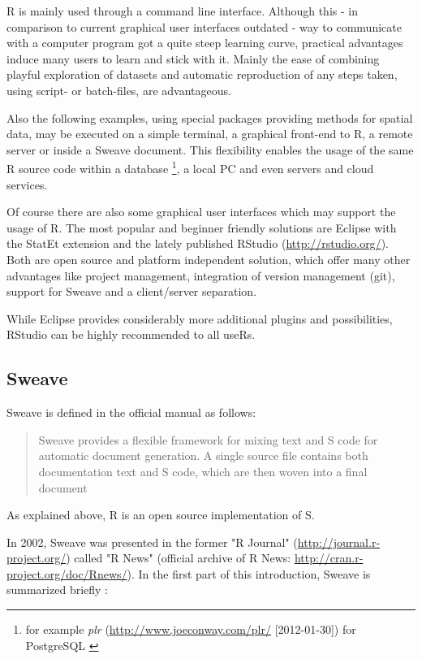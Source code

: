 \documentclass{ifacconf}
\begin{document}
R is mainly used through a command line interface. Although this - in comparison
to current graphical user interfaces outdated - way to communicate 
with a computer program got a quite steep learning curve, practical 
advantages induce many users to learn and stick with it. Mainly the
ease of combining playful exploration of datasets and automatic
reproduction of any steps taken, using script- or batch-files, are advantageous.

Also the following examples, using special packages providing methods 
for spatial data, may be executed on a simple terminal, a graphical front-end to R,
a remote server or inside a Sweave document. This flexibility enables 
the usage of the same R source code within a database
\footnote{for example \textit{plr} (\url{http://www.joeconway.com/plr/} [2012-01-30]) for PostgreSQL 
\citep{group2011postgresql}}, a local PC and even servers and cloud services.

Of course there are also some graphical user interfaces which may support
the usage of R. The most popular and beginner friendly solutions are
Eclipse with the StatEt extension and the lately published RStudio
(\url{http://rstudio.org/}). Both are open source and platform independent solution,
which offer many other advantages like project management, integration of version 
management (git), support for Sweave and a client/server separation.

While Eclipse provides considerably more additional plugins and possibilities,
RStudio can be highly recommended to all useRs.

\subsection{Sweave}
Sweave is defined in the official manual \citep{Sweave:Leisch:2002} as follows:
\begin{quotation}
Sweave provides a flexible 
framework for mixing text 
and S code for automatic document generation. 
A single source file contains both documentation text and S code, which are then woven
into a final document
\end{quotation} 

As explained above, R is an open source implementation of S.

In 2002, Sweave was presented in the former "R Journal"
(\url{http://journal.r-project.org/}) called "R News" (official archive of R News: \url{http://cran.r-project.org/doc/Rnews/}). In the first part of this 
introduction, Sweave is summarized briefly \citep{Sweave:Leisch:2002}:
\end{document}
